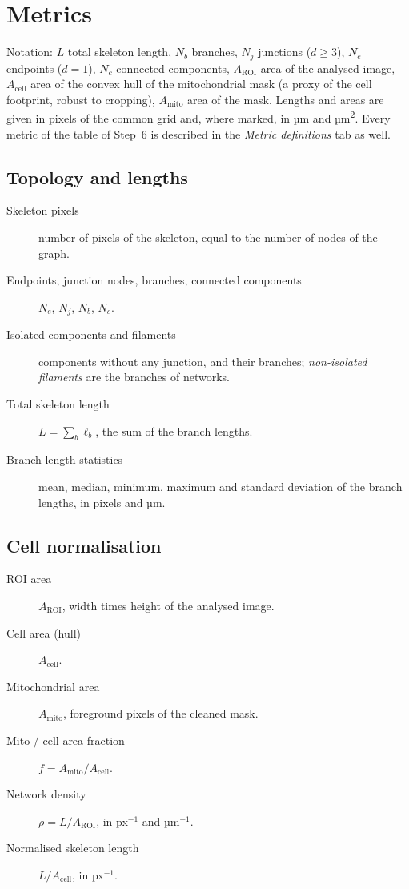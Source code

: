 \documentclass[fontsize=10.5pt,paper=a4,parskip=half,headings=normal,numbers=noenddot,
  open=any,captions=tableheading]{scrreprt}
\begin{document}
\chapter{Metrics}\label{ch:metrics}

Notation: $L$ total skeleton length, $N_b$ branches, $N_j$ junctions ($d\ge3$), $N_e$ endpoints ($d=1$), $N_c$ connected components, $A_{\mathrm{ROI}}$ area of the analysed image, $A_{\mathrm{cell}}$ area of the convex hull of the mitochondrial mask (a proxy of the cell footprint, robust to cropping), $A_{\mathrm{mito}}$ area of the mask. Lengths and areas are given in pixels of the common grid and, where marked, in µm and µm\textsuperscript{2}. Every metric of the table of Step~6 is described in the \emph{Metric definitions} tab as well.

\section{Topology and lengths}
\begin{description}
\item[Skeleton pixels] number of pixels of the skeleton, equal to the number of nodes of the graph.
\item[Endpoints, junction nodes, branches, connected components] $N_e$, $N_j$, $N_b$, $N_c$.
\item[Isolated components and filaments] components without any junction, and their branches; \emph{non-isolated filaments} are the branches of networks.
\item[Total skeleton length] $L=\sum_b \ell_b$, the sum of the branch lengths.
\item[Branch length statistics] mean, median, minimum, maximum and standard deviation of the branch lengths, in pixels and µm.
\end{description}

\section{Cell normalisation}
\begin{description}
\item[ROI area] $A_{\mathrm{ROI}}$, width times height of the analysed image.
\item[Cell area (hull)] $A_{\mathrm{cell}}$.
\item[Mitochondrial area] $A_{\mathrm{mito}}$, foreground pixels of the cleaned mask.
\item[Mito / cell area fraction] $f = A_{\mathrm{mito}}/A_{\mathrm{cell}}$.
\item[Network density] $\rho = L/A_{\mathrm{ROI}}$, in px$^{-1}$ and µm$^{-1}$.
\item[Normalised skeleton length] $L/A_{\mathrm{cell}}$, in px$^{-1}$.
\end{description}
\end{document}
